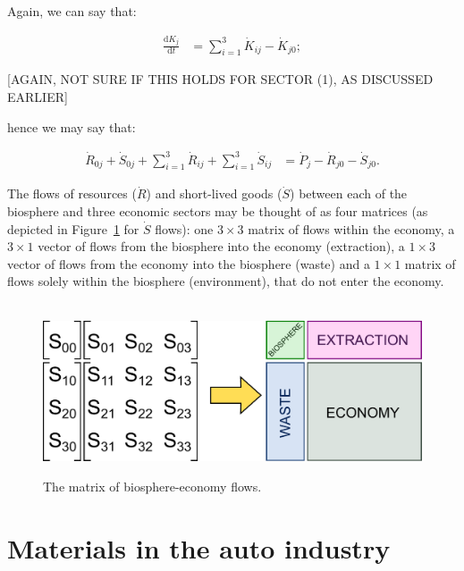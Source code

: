 Again, we can say that:

\begin{align} \label{eq:C_CV_K_balance}
	\frac{\mathrm{d}K_{j}}{\mathrm{d}t}		
	& =  \sum_{i = 1}^{3}\dot{K}_{ij}
	- \dot{K}_{j0};
\end{align}

[AGAIN, NOT SURE IF THIS HOLDS FOR SECTOR (1), AS DISCUSSED EARLIER]

\noindent hence we may say that:

\begin{align} \label{eq:C_CV_1_to_3_c}
	\dot{R}_{0j} 
	+ \dot{S}_{0j}
	+ \sum_{i = 1}^{3}\dot{R}_{ij}
	+ \sum_{i = 1}^{3}\dot{S}_{ij}
	& = \dot{P}_{j}
	- \dot{R}_{j0} 
	- \dot{S}_{j0}.
\end{align}

The flows of resources ($\dot{R}$) and short-lived goods ($\dot{S}$) between each of the biosphere and three economic sectors may be thought of as four matrices (as depicted in Figure~\ref{fig:C_mat_matrix} for $\dot{S}$ flows): one $3\times3$ matrix of flows within the economy, a $3\times1$ vector of flows from the biosphere into the economy (extraction), a $1\times3$ vector of flows from the economy into the biosphere (waste) and a $1\times1$ matrix of flows solely within the biosphere (environment), that do not enter the economy.

\begin{figure}[!ht]
\centering\
\includegraphics[width=0.8\linewidth]{Part_1/Chapter_Materials/images/Matrix.pdf}
\caption[The matrix of biosphere\index{biosphere}-economy flows.]{The matrix of biosphere-economy flows.}
\label{fig:C_mat_matrix}
\end{figure}

\section{Materials in the auto industry}
\label{sec:materials_auto}

